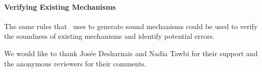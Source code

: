 \documentclass[sigplan,10pt]{acmart}\settopmatter{printfolios=true,printccs=false,printacmref=false}
\begin{document}
\paragraph{Verifying Existing Mechanisms} The same rules that \ottifc\ uses to generate sound mechanisms could be used to verify the soundness of existing mechanisms and identify potential errors.

\begin{acks}
We would like to thank Josée Desharnais and Nadia Tawbi for their support and the anonymous reviewers for their comments.
\end{acks}


\end{document}
